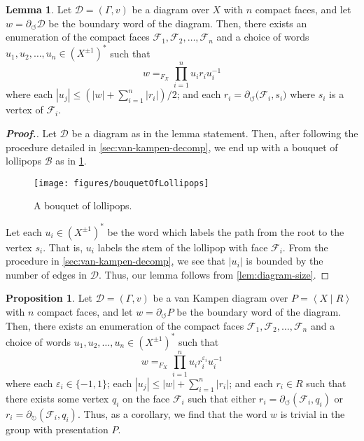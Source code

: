 \documentclass[11pt,a4paper,reqno]{amsart}
\theoremstyle{plain}
\theoremstyle{definition}
\newtheorem{lemma}[theorem]{Lemma}
\newtheorem{proposition}[theorem]{Proposition}
\theoremstyle{definition}
\renewcommand\leq\leqslant
\newenvironment{myproof}{\begin{proof}[\normalfont\bfseries Proof.]}{\end{proof}}
\begin{document}
\begin{lemma}\label{lem:diagram-decomp}
	Let $\mathcal D = (\Gamma, v)$ be a diagram over $X$ with $n$ compact faces, and let $w = \partial_\circlearrowleft \mathcal D$ be the boundary word of the diagram.
	Then, there exists an enumeration of the compact faces $\mathcal F_1, \mathcal F_2,\ldots, \mathcal F_n$ and a choice of words $u_1,u_2,\ldots,u_n\in (X^{\pm 1})^*$ such that
	\[
		w
		=_{F_X}
		\prod_{i=1}^{n}
		u_i r_i u_{i}^{-1}
	\]
	where
	each $|u_j|\leq (|w|+\sum_{i=1}^n |r_i|)/2$;
	and each $r_i  = \partial_{\circlearrowleft} \mathcal (\mathcal F_i,s_i)$ where $s_i$ is a vertex of $\mathcal F_i$.
\end{lemma}

\begin{myproof}
	Let $\mathcal D$ be a diagram as in the lemma statement.
	Then, after following the procedure detailed in \cref{sec:van-kampen-decomp}, we end up with a bouquet of lollipops $\mathcal B$ as in \cref{fig:bouquet-of-lollipops}.

	\begin{figure}[ht!]
		\centering
		\texttt{[image: figures/bouquetOfLollipops]}
		\caption{A bouquet of lollipops.}\label{fig:bouquet-of-lollipops}
	\end{figure}

	Let each $u_i\in (X^{\pm 1})^*$ be the word which labels the path from the root to the vertex $s_i$.
	That is, $u_i$ labels the stem of the lollipop with face $\mathcal F_i$.
	From the procedure in \cref{sec:van-kampen-decomp}, we see that $|u_i|$ is bounded by the number of edges in $\mathcal D$.
	Thus, our lemma follows from \cref{lem:diagram-size}.
\end{myproof}

\begin{proposition}\label{prop:van-kampen-decomp}
	Let $\mathcal D = (\Gamma, v)$ be a van Kampen diagram over $P = \left\langle X\mid R\right\rangle$ with $n$ compact faces, and let $w = \partial_\circlearrowleft P$ be the boundary word of the diagram.
	Then, there exists an enumeration of the compact faces $\mathcal F_1, \mathcal F_2,\ldots, \mathcal F_n$ and a choice of words $u_1,u_2,\ldots,u_n\in (X^{\pm 1})^*$ such that
	\[
		w
		=_{F_X}
		\prod_{i=1}^{n}
		u_i r_i^{\varepsilon_i} u_{i}^{-1}
	\]
	where
	each $\varepsilon_i\in \{-1,1\}$;
	each $|u_j|\leq |w|+\sum_{i=1}^n |r_i|$;
	and each $r_i \in R$ such that there exists some vertex $q_i$ on the face $\mathcal F_i$ such that either $r_i =\partial_\circlearrowleft (\mathcal F_i, q_i)$ or $r_i =\partial_\circlearrowright (\mathcal F_i, q_i)$.
	Thus, as a corollary, we find that the word $w$ is trivial in the group with presentation $P$.
\end{proposition}
\end{document}
